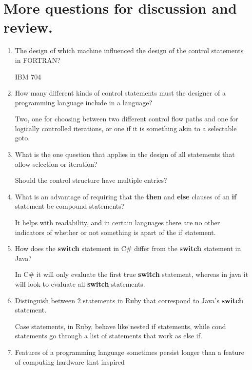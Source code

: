 \section{More questions for discussion and review.}
\begin{enumerate}
\item The design of which machine influenced the design
of the control statements in FORTRAN?
\begin{answer}
IBM 704
\end{answer}
\item How many different kinds of control statements
must the designer of a programming language include
in a language?
\begin{answer}
Two, one for choosing between two different control flow paths and one for logically controlled iterations, or one if it is something akin to a selectable goto.
\end{answer}
\item What is the one question that applies in the
design of all statements that allow selection or
iteration?
\begin{answer}
Should the control structure have multiple entries?
\end{answer}
\item What is an advantage of requiring that
the \textbf{then} and \textbf{else} clauses of
an \textbf{if} statement be compound statements?
\begin{answer}
It helps with readability, and in certain languages there are no other indicators of whether or not something is apart of the if statement.
\end{answer}
\item How does the \textbf{switch} statement in C\#
differ from the \textbf{switch} statement in Java?
\begin{answer}
In C\# it will only evaluate the first true \textbf{switch} statement, whereas in java it will look to evaluate all \textbf{switch} statements.
\end{answer}
\item Distinguish between 2 statements in Ruby
that correspond to Java's \textbf{switch} statement.
\begin{answer}
Case statements, in Ruby, behave like nested if statements, while cond statements go through a list of statements that work as else if.
\end{answer}
\item Features of a programming language sometimes persist
longer than a feature of computing hardware that inspired

\end{enumerate}
